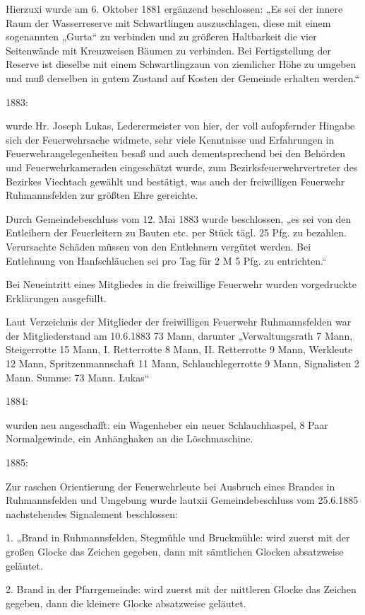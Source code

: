 \documentclass{book}
\begin{document}
Hierzuxi wurde am 6. Oktober 1881 ergänzend beschlossen: „Es sei der innere Raum
der Wasserreserve mit Schwartlingen auszuschlagen, diese mit einem sogenannten
„Gurta“ zu verbinden und zu größeren Haltbarkeit die vier Seitenwände mit
Kreuzweisen Bäumen zu verbinden. Bei Fertigstellung der Reserve ist dieselbe mit
einem Schwartlingzaun von ziemlicher Höhe zu umgeben und muß derselben in gutem
Zustand auf Kosten der Gemeinde erhalten werden.“

1883:

wurde Hr. Joseph Lukas, Lederermeister von hier, der voll aufopfernder Hingabe
sich der Feuerwehrsache widmete, sehr viele Kenntnisse und Erfahrungen in
Feuerwehrangelegenheiten besaß und auch dementsprechend bei den Behörden und
Feuerwehrkameraden eingeschätzt wurde, zum Bezirksfeuerwehrvertreter des
Bezirkes Viechtach gewählt und bestätigt, was auch der freiwilligen Feuerwehr
Ruhmannsfelden zur größten Ehre gereichte.

Durch Gemeindebeschluss vom 12. Mai 1883 wurde beschlossen, „es sei von den
Entleihern der Feuerleitern zu Bauten etc. per Stück tägl. 25 Pfg. zu bezahlen.
Verursachte Schäden müssen von den Entlehnern vergütet werden. Bei Entlehnung
von Hanfschläuchen sei pro Tag für 2 M 5 Pfg. zu entrichten.“

Bei Neueintritt eines Mitgliedes in die freiwillige Feuerwehr wurden
vorgedruckte Erklärungen ausgefüllt.

Laut Verzeichnis der Mitglieder der freiwilligen Feuerwehr Ruhmannsfelden war
der Mitgliederstand am 10.6.1883 73 Mann, darunter „Verwaltungsrath 7 Mann,
Steigerrotte 15 Mann, I. Retterrotte 8 Mann, II. Retterrotte 9 Mann, Werkleute
12 Mann, Spritzenmannschaft 11 Mann, Schlauchlegerrotte 9 Mann, Signalisten 2
Mann. Summe: 73 Mann. Lukas“

1884:

wurden neu angeschafft: ein Wagenheber ein neuer Schlauchhaspel, 8 Paar
Normalgewinde, ein Anhänghaken an die Löschmaschine.

1885:

Zur raschen Orientierung der Feuerwehrleute bei Ausbruch eines Brandes in
Ruhmannsfelden und Umgebung wurde lautxii Gemeindebeschluss vom 25.6.1885
nachstehendes Signalement beschlossen:

1. „Brand in Ruhmannsfelden, Stegmühle und Bruckmühle: wird zuerst mit der
großen Glocke das Zeichen gegeben, dann mit sämtlichen Glocken absatzweise
geläutet.

2. Brand in der Pfarrgemeinde: wird zuerst mit der mittleren Glocke das Zeichen
gegeben, dann die kleinere Glocke absatzweise geläutet.
\end{document}
